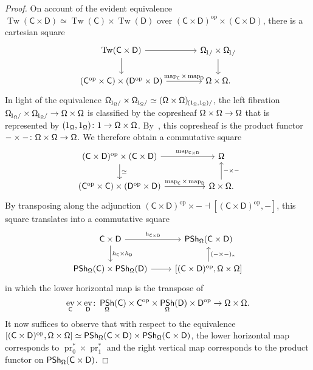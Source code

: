 \documentclass[reqno]{amsart}
\numberwithin{equation}{subsection}
\theoremstyle{plain}
\theoremstyle{definition}
\DeclareMathOperator{\ev}{ev}
\DeclareMathOperator{\IPSh}{\mathsf{PSh}}
\DeclareMathOperator{\Tw}{Tw}
\DeclareMathOperator{\Map}{map}
\DeclareMathOperator{\pr}{pr}
\newcommand{\op}{\mathrm{op}}
\newcommand{\map}[1]{\Map_{#1}}
\newcommand{\Under}[2]{#1_{\hspace{-1pt}#2/}}
\newcommand{\I}[1]{\mathsf{#1}}
\newcommand{\iFun}[2]{{[#1,#2]}}
\begin{document}
\begin{proof}
	 On account of the evident equivalence $\Tw(\I{C}\times\I{D})\simeq\Tw(\I{C})\times\Tw(\I{D})$ over $(\I{C}\times\I{D})^\op\times(\I{C}\times\I{D})$, there is a cartesian square
	 \begin{equation*}
	 \begin{tikzcd}[column sep=large]
	 \Tw(\I{C}\times\I{D})\arrow[d]\arrow[r] & \Under{\Univ}{1}\times\Under{\Univ}{1}\arrow[d]\\
	 (\I{C}^{\op}\times\I{C})\times(\I{D}^\op\times\I{D})\arrow[r, "\map{\I{C}}\times\map{\I{D}}"] & \Univ\times\Univ.
	 \end{tikzcd}
	 \end{equation*}
	 In light of the equivalence $\Under{\Univ}{1_{\Univ}}\times\Under{\Univ}{1_{\Univ}}\simeq\Under{(\Univ\times\Univ)}{(1_{\Univ},1_{\Univ})}$, the left fibration $\Under{\Univ}{1_{\Univ}}\times\Under{\Univ}{1_{\Univ}}\to\Univ\times\Univ$ is classified by the copresheaf $\Univ\times\Univ\to\Univ$ that is represented by $(1_{\Univ},1_{\Univ})\colon 1\to\Univ\times\Univ$. By~\cite[Corollary~4.4.7]{Martini2021a}, this copresheaf is the product functor $-\times -\colon \Univ\times\Univ\to\Univ$. We therefore obtain a commutative square
	 \begin{equation*}
	 \begin{tikzcd}[column sep=huge]
	 (\I{C}\times\I{D})^{\op}\times(\I{C}\times\I{D})\arrow[d, "\simeq"] \arrow[r, "\map{\I{C}\times\I{D}}"] & \Univ\\
	 (\I{C}^{\op}\times\I{C})\times(\I{D}^\op\times\I{D})\arrow[r, "\map{\I{C}}\times\map{\I{D}}"] & \Univ\times\Univ\arrow[u, "-\times-"'].
	 \end{tikzcd}
	 \end{equation*}
	 By transposing along the adjunction $(\I{C}\times\I{D})^{\op}\times -\dashv \iFun{(\I{C}\times\I{D})^{\op}}{-}$, this square translates into a commutative square
	\begin{equation*}
	\begin{tikzcd}
	\I{C}\times\I{D}\arrow[r, "h_{\I{C}\times\I{D}}"]\arrow[d, "h_{\I{C}}\times h_{\I{D}}"] & \IPSh_{\Univ}(\I{C}\times\I{D})\\
	\IPSh_{\Univ}(\I{C})\times\IPSh_{\Univ}(\I{D})\arrow[r] & \iFun{(\I{C}\times\I{D})^{\op}}{\Univ\times\Univ}\arrow[u, "(-\times-)_\ast"']
	\end{tikzcd}
	\end{equation*}
	in which the lower horizontal map is the transpose of
	\begin{equation*}
	\ev_{\I{C}}\times\ev_{\I{D}}\colon \IPSh_{\Univ}(\I{C})\times\I{C}^{\op}\times\IPSh_{\Univ}(\I{D})\times\I{D}^{\op}\to\Univ\times\Univ.
	\end{equation*}
	It now suffices to observe that with respect to the equivalence $\iFun{(\I{C}\times\I{D})^{\op}}{\Univ\times\Univ}\simeq\IPSh_{\Univ}(\I{C}\times\I{D})\times\IPSh_{\Univ}(\I{C}\times\I{D})$, the lower horizontal map corresponds to $\pr_0^\ast\times\pr_1^\ast$ and the right vertical map corresponds to the product functor on $\IPSh_{\Univ}(\I{C}\times\I{D})$.
\end{proof}
\end{document}
